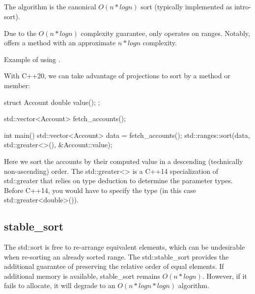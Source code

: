 \subsection{\texorpdfstring{}{\texttt{std::sort}}}

The  algorithm is the canonical $O(n*logn)$ sort (typically implemented as intro-sort).


Due to the $O(n*logn)$ complexity guarantee,  only operates on  ranges. Notably,  offers a method with an approximate $n*logn$ complexity.

\begin{box-note}
\footnotesize Example of using .
\tcblower
{}
\end{box-note}

With C++20, we can take advantage of projections to sort by a method or member:

\begin{box-note}
\begin{cppcode}
struct Account {
    double value();
};

std::vector<Account> fetch_accounts();

int main() {
    std::vector<Account> data = fetch_accounts();
    std::ranges::sort(data, std::greater<>(), &Account::value);
}
\end{cppcode}
\end{box-note}

Here we sort the accounts by their computed value in a descending (technically non-ascending) order. The std::greater<> is a C++14 specialization of std::greater that relies on type deduction to determine the parameter types. Before C++14, you would have to specify the type (in this case std::greater<double>()).


\subsection{stable\_sort}

The std::sort is free to re-arrange equivalent elements, which can be undesirable when re-sorting an already sorted range. The std::stable\_sort provides the additional guarantee of preserving the relative order of equal elements. If additional memory is available, stable\_sort remains $O(n*logn)$. However, if it fails to allocate, it will degrade to an $O(n*logn*logn)$ algorithm.

